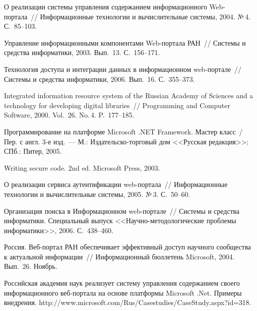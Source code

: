 \begin{multicols}{2}
{{\begin{thebibliography}{99}
 О реализации системы управления содержанием информационного Web-пор\-та\-ла~//
Информационные технологии и вы\-чис\-ли\-тель\-ные сис\-те\-мы, %
2004. №\,4. С.~85--103.

Управление информационными компонентами Web-портала РАН~// Сис\-те\-мы и
средства информатики, %
2003. Вып.~13. С.~156--171.

Технология доступа и интеграции данных в информационном web-портале~//
Сис\-те\-мы и средства информатики, %
2006. Вып.~16. С.~355--373.

 Integrated information resource system of the Russian Academy of Sciences and a technology
for developing digital libraries~// Programming and Computer Software, 2000. Vol.~26. No.\,4.
P.~177--185.

Программирование на платформе Microsoft .NET Framework. Мастер класс~/
Пер. с англ. 3-е изд.~--- М.: Издательско-торговый дом <<Русская редакция>>;
СПб.: Питер, 2005.

Writing secure code. 2nd ed. Microsoft Press, 2003.

О реализации сервиса аутентификации web-портала~// Информационные технологии
и вычислительные системы, %
2005. №\,3. С.~50--60.

Организация поиска в Информационном web-портале~// Системы и средства
информатики. Специальный выпуск <<Научно-ме\-то\-до\-ло\-ги\-че\-ские
проблемы информатики>>, %
2006. С.~438--460.

Россия. Веб-портал РАН обеспечивает эффективный доступ научного сообщества к
актуальной информации~// Информационный бюллетень Microsoft, 2004. Вып.~26.
Ноябрь.

Российская академия наук реализует систему управ\-ле\-ния содержанием своего
информационного веб-портала на основе платформы Microsoft .Net. Примеры внедрения.
{\sf http://www.microsoft.com/Rus/\linebreak Casestudies/CaseStudy.aspx?id=318}.
\end{thebibliography}

}
}

\end{multicols}

\label{end\stat}